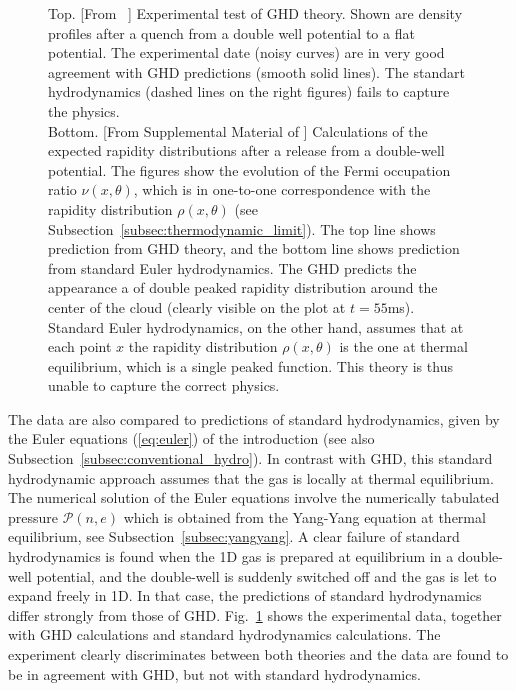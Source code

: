 \documentclass[onecolumn,amsfonts,showpacs,superscriptaddress]{revtex4-1}
\begin{document}
\begin{figure}[ht]
    \caption{
    Top. [From  ~\cite{schemmer2019generalized}] Experimental test of GHD theory. Shown are density profiles after a quench from a double well potential to a flat potential. The experimental date (noisy curves) are in very good agreement with GHD predictions (smooth solid lines). The standart hydrodynamics (dashed lines on the right figures) fails to capture the physics. \\
    Bottom. [From Supplemental Material of \citep{schemmer2019generalized}] Calculations of the expected rapidity distributions after a release from a double-well potential. The figures show the evolution of the Fermi occupation ratio $\nu(x,\theta)$, which is in one-to-one correspondence with the rapidity distribution $\rho(x,\theta)$ (see Subsection~\ref{subsec:thermodynamic_limit}). The top line shows prediction from GHD theory, and the bottom line shows prediction from standard Euler hydrodynamics. The GHD predicts the appearance a of double peaked rapidity distribution around the center of the cloud (clearly visible on the plot at $t=55$ms). Standard Euler hydrodynamics, on the other hand, assumes that at each point $x$ the rapidity distribution $\rho(x,\theta)$ is the one at thermal equilibrium, which is a single peaked function. This theory is thus unable to capture the correct physics. 
    }
    \label{fig:testGHDSchemmer}
\end{figure}

The data are also compared to predictions of standard hydrodynamics, given by the Euler equations (\ref{eq:euler}) of the introduction  (see also Subsection~\ref{subsec:conventional_hydro}).
In contrast with GHD, this standard hydrodynamic approach assumes that the gas is locally
at thermal equilibrium. The numerical solution of the Euler equations involve the numerically tabulated pressure $\mathcal{P}(n,e)$ which is obtained from the Yang-Yang 
equation at thermal equilibrium, see Subsection~\ref{subsec:yangyang}.
A clear failure of standard
hydrodynamics is found when the 1D gas is prepared at equilibrium in a double-well potential, and the double-well is suddenly switched off and the gas is let to expand freely in 1D. 
In that case, the predictions of standard hydrodynamics differ strongly from those of GHD. Fig.~\ref{fig:testGHDSchemmer} shows the experimental data, together with 
GHD calculations and standard hydrodynamics calculations. 
 The experiment clearly discriminates between both theories and the data are found to be in agreement with GHD, but not with standard hydrodynamics. 
\end{document}
